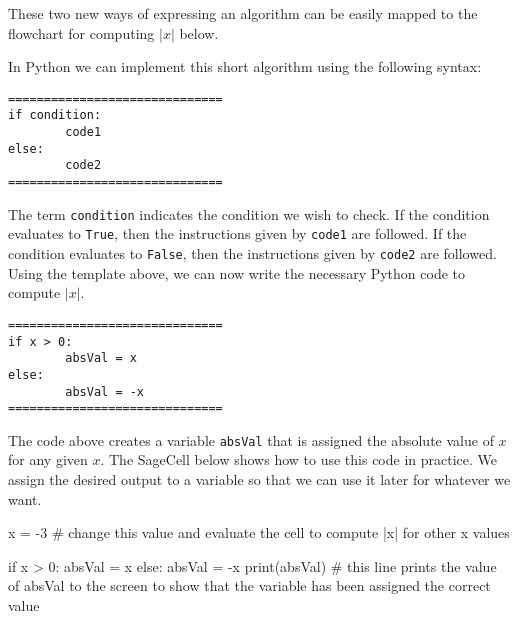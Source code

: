 \documentclass{ximera}
\begin{document}
These two new ways of expressing an algorithm can be easily mapped to the flowchart for computing $|x|$ below.

\begin{center}
\end{center}

In Python we can implement this short algorithm using the following syntax:

\begin{verbatim}
==============================
if condition:
        code1
else:
        code2
==============================
\end{verbatim}

The term \verb|condition| indicates the condition we wish to check. If the condition evaluates to \verb|True|, then the instructions given by \verb|code1| are followed. If the condition evaluates to \verb|False|, then the instructions given by \verb|code2| are followed. Using the template above, we can now write the necessary Python code to compute $|x|$.

\begin{verbatim}
==============================
if x > 0:
        absVal = x
else:
        absVal = -x
==============================
\end{verbatim}

The code above creates a variable \verb|absVal| that is assigned the absolute value of $x$ for any given $x$. The SageCell below shows how to use this code in practice. We assign the desired output to a variable so that we can use it later for whatever we want.

\begin{sageCell}
x = -3               # change this value and evaluate the cell to compute |x| for other x values

if x > 0:
	absVal = x
else:
	absVal = -x
print(absVal)        # this line prints the value of absVal to the screen to show that the variable has been assigned the correct value
\end{sageCell}
\end{document}
